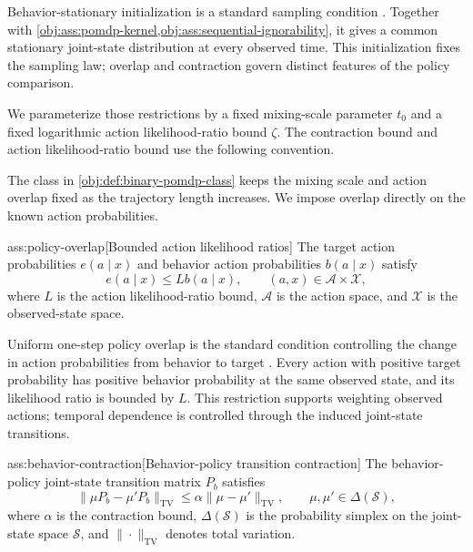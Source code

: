 Behavior-stationary initialization is a standard sampling condition \citep{HuWager2023}. Together with \cref{obj:ass:pomdp-kernel,obj:ass:sequential-ignorability}, it gives a common stationary joint-state distribution at every observed time. This initialization fixes the sampling law; overlap and contraction govern distinct features of the policy comparison.

We parameterize those restrictions by a fixed mixing-scale parameter \(t_0\) and a fixed logarithmic action likelihood-ratio bound \(\zeta\). The contraction bound  and action likelihood-ratio bound  use the following convention.



The class in \cref{obj:def:binary-pomdp-class} keeps the mixing scale and action overlap fixed as the trajectory length increases. We impose overlap directly on the known action probabilities.

\begin{assumptionv}{ass:policy-overlap}[Bounded action likelihood ratios]
The target action probabilities \(e(a\mid x)\) and behavior action probabilities \(b(a\mid x)\) satisfy
\[
e(a\mid x)\le Lb(a\mid x),
\qquad (a,x)\in\mathcal A\times\mathcal X,
\]
where \(L\) is the action likelihood-ratio bound, \(\mathcal A\) is the action space, and \(\mathcal X\) is the observed-state space.
\end{assumptionv}

Uniform one-step policy overlap is the standard condition controlling the change in action probabilities from behavior to target \citep{HuWager2023}. Every action with positive target probability has positive behavior probability at the same observed state, and its likelihood ratio is bounded by \(L\). This restriction supports weighting observed actions; temporal dependence is controlled through the induced joint-state transitions.

\begin{assumptionv}{ass:behavior-contraction}[Behavior-policy transition contraction]
The behavior-policy joint-state transition matrix \(P_b\) satisfies
\[
\|\mu P_b-\mu'P_b\|_{\mathrm{TV}}
\le
\alpha\|\mu-\mu'\|_{\mathrm{TV}},
\qquad \mu,\mu'\in\Delta(\mathcal S),
\]
where \(\alpha\) is the contraction bound, \(\Delta(\mathcal S)\) is the probability simplex on the joint-state space \(\mathcal S\), and \(\|\cdot\|_{\mathrm{TV}}\) denotes total variation.
\end{assumptionv}

